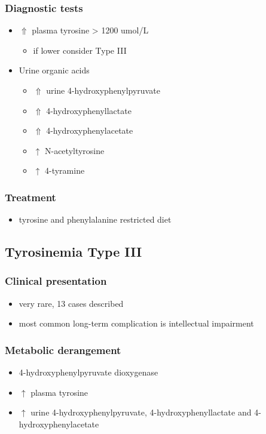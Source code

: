 \documentclass{scrartcl}
\begin{document}
\subsubsection{Diagnostic tests}
\label{sec:org6cbf75f}
\begin{itemize}
\item \(\Uparrow\) plasma tyrosine > 1200 umol/L
\begin{itemize}
\item if lower consider Type III
\end{itemize}
\item Urine organic acids
\begin{itemize}
\item \(\Uparrow\) urine 4-hydroxyphenylpyruvate
\item \(\Uparrow\) 4-hydroxyphenyllactate
\item \(\Uparrow\) 4-hydroxyphenylacetate
\item \(\uparrow\) N-acetyltyrosine
\item \(\uparrow\) 4-tyramine
\end{itemize}
\end{itemize}

\subsubsection{Treatment}
\label{sec:org948c1ae}
\begin{itemize}
\item tyrosine and phenylalanine restricted diet
\end{itemize}

\subsection{Tyrosinemia Type III}
\label{sec:org4cfe2b2}
\subsubsection{Clinical presentation}
\label{sec:orgfe1a00d}
\begin{itemize}
\item very rare, 13 cases described
\item most common long-term complication is intellectual impairment
\end{itemize}
\subsubsection{Metabolic derangement}
\label{sec:org78fc633}
\begin{itemize}
\item 4-hydroxyphenylpyruvate dioxygenase
\end{itemize}
\begin{itemize}
\item \(\uparrow\) plasma tyrosine
\item \(\uparrow\) urine 4-hydroxyphenylpyruvate, 4-hydroxyphenyllactate and 4-hydroxyphenylacetate
\end{itemize}
\end{document}
